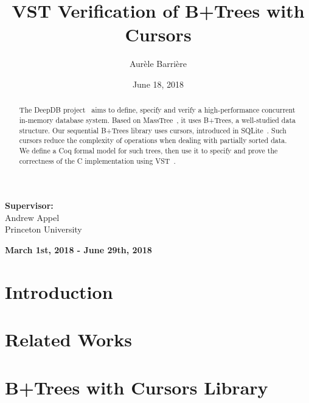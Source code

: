 \documentclass{llncs2e/llncs}
\begin{document}
\setcounter{page}{0}
\pagestyle{headings}
\title{VST Verification of B+Trees with Cursors}
\author{Aur\`ele Barri\`ere}
\date{June 18, 2018}
\maketitle
\begin{center}
  \textbf{Supervisor: }\\
  Andrew Appel
  ~\\
  Princeton University
\end{center}
\begin{center}
  \textbf{March 1st, 2018 - June 29th, 2018}
\end{center}
\vfill
\begin{abstract}
  The DeepDB project~\cite{deepdb} aims to define, specify and verify a high-performance concurrent in-memory database system.
  Based on MassTree~\cite{masstree}, it uses B+Trees, a well-studied data structure.
  Our sequential B+Trees library uses cursors, introduced in SQLite~\cite{sqlite}.
  Such cursors reduce the complexity of operations when dealing with partially sorted data.
  We define a Coq formal model for such trees, then use it to specify and prove the correctness of the C implementation using VST~\cite{vst}.
  
\end{abstract}
\vfill
\newpage

\def\btree{B+Tree}
\def\btrees{B+Trees}
\def\todo#1{{\color{red}#1}}
\def\btrep{\texttt{btnode\_rep}}

%


\section{Introduction}
\label{sec:intro}


\section{Related Works}
\label{sec:related}


\section{B+Trees with Cursors Library}
\label{sec:btrees}

\end{document}
